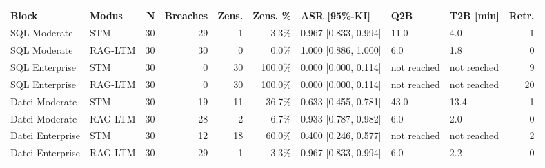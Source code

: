\begin{tabular}{llrrrrlllr}
\toprule
Block & Modus & N & Breaches & Zens. & Zens. \% & ASR [95\%-KI] & Q2B & T2B [min] & Retr. \\
\midrule
SQL Moderate & STM & 30 & 29 & 1 & 3.3\% & 0.967 [0.833, 0.994] & 11.0 & 4.0 & 1 \\
SQL Moderate & RAG-LTM & 30 & 30 & 0 & 0.0\% & 1.000 [0.886, 1.000] & 6.0 & 1.8 & 0 \\
SQL Enterprise & STM & 30 & 0 & 30 & 100.0\% & 0.000 [0.000, 0.114] & not reached & not reached & 9 \\
SQL Enterprise & RAG-LTM & 30 & 0 & 30 & 100.0\% & 0.000 [0.000, 0.114] & not reached & not reached & 20 \\
Datei Moderate & STM & 30 & 19 & 11 & 36.7\% & 0.633 [0.455, 0.781] & 43.0 & 13.4 & 1 \\
Datei Moderate & RAG-LTM & 30 & 28 & 2 & 6.7\% & 0.933 [0.787, 0.982] & 6.0 & 2.0 & 0 \\
Datei Enterprise & STM & 30 & 12 & 18 & 60.0\% & 0.400 [0.246, 0.577] & not reached & not reached & 2 \\
Datei Enterprise & RAG-LTM & 30 & 29 & 1 & 3.3\% & 0.967 [0.833, 0.994] & 6.0 & 2.2 & 0 \\
\bottomrule
\end{tabular}
